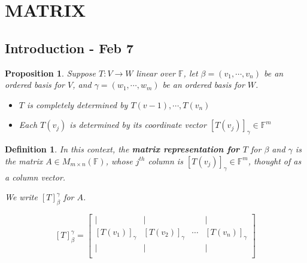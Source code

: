 \documentclass[12pt]{article}
\theoremstyle{plain}
\newtheorem{definition}{Definition}[subsection]
\newtheorem{proposition}{Proposition}[subsection]
\newcommand{\mF}{{\mathbb{F}}}
\begin{document}
	
	
	\newpage
	\section{MATRIX}
	\subsection{Introduction - Feb 7}
	\begin{proposition}
		Suppose $T:V\to W$ linear over $\mF$, 
		let $\beta = (v_1,\cdots, v_n)$ be an ordered basis for $V$,
		and $\gamma = (w_1, \cdots, w_m)$ be an ordered basis for $W$. 
		\begin{itemize}
			\item $T$ is completely determined by $T(v-1), \cdots, T(v_n)$
			\item Each $T(v_j)$ is determined by its coordinate vector 
				$[T(v_j)]_{\gamma} \in \mF^m$\\
		\end{itemize}
	\end{proposition}

	\begin{definition}
		In this context, the \textbf{matrix representation for $T$}
		for $\beta$ and $\gamma$ is the matrix $A \in M_{m\times n}(\mF)$, 
		whose $j^{th}$ column is $[T(v_j)]_{\gamma} \in \mF^m$, 
		thought of as a column vector.
		
		We write $[T]^{\gamma}_{\beta}$ for $A$. 

		\[
			[T]^{\gamma}_{\beta} = 
			\begin{bmatrix}
				| & | &  & | \\
				[T(v_1)]_{\gamma} & [T(v_2)]_{\gamma} & \cdots 
								  & [T(v_n)]_{\gamma}\\
				| & | & & | \\
			\end{bmatrix}
		\]\\
	\end{definition}
	
\end{document}
